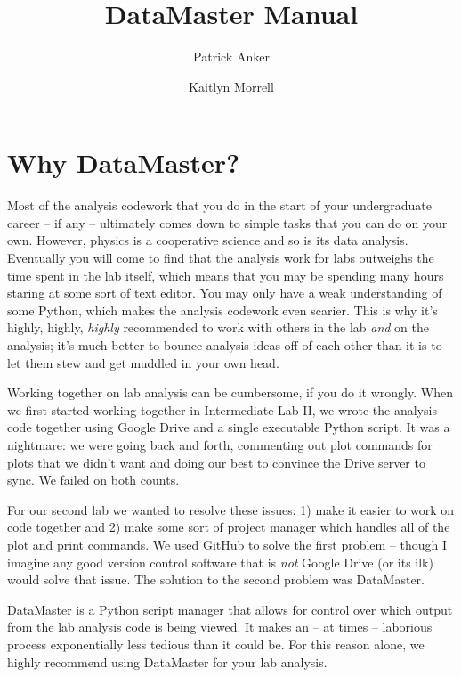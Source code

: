 \documentclass[12pt]{article}
\title{DataMaster Manual}
\author{Patrick Anker \and Kaitlyn Morrell}
\date{}
\newcounter{problem}
\begin{document}
{\selectfont

\maketitle 

\tableofcontents

\section*{Why DataMaster?}

Most of the analysis codework that you do in the start of your undergraduate career -- if any -- ultimately comes down to simple tasks that you can do on your own. However, physics is a cooperative science and so is its data analysis. Eventually you will come to find that the analysis work for labs outweighs the time spent in the lab itself, which means that you may be spending many hours staring at some sort of text editor. You may only have a weak understanding of some Python, which makes the analysis codework even scarier. This is why it's highly, highly, \textit{highly} recommended to work with others in the lab \textit{and} on the analysis; it's much better to bounce analysis ideas off of each other than it is to let them stew and get muddled in your own head.

Working together on lab analysis can be cumbersome, if you do it wrongly. When we first started working together in Intermediate Lab II, we wrote the analysis code together using Google Drive and a single executable Python script. It was a nightmare: we were going back and forth, commenting out plot commands for plots that we didn't want and doing our best to convince the Drive server to sync. We failed on both counts.

For our second lab we wanted to resolve these issues: 1) make it easier to work on code together and 2) make some sort of project manager which handles all of the plot and print commands. We used \href{https://github.com/}{GitHub} to solve the first problem -- though I imagine any good version control software that is \textit{not} Google Drive (or its ilk) would solve that issue. The solution to the second problem was DataMaster.

DataMaster is a Python script manager that allows for control over which output from the lab analysis code is being viewed. It makes an -- at times -- laborious process exponentially less tedious than it could be. For this reason alone, we highly recommend using DataMaster for your lab analysis.

}
\end{document}
